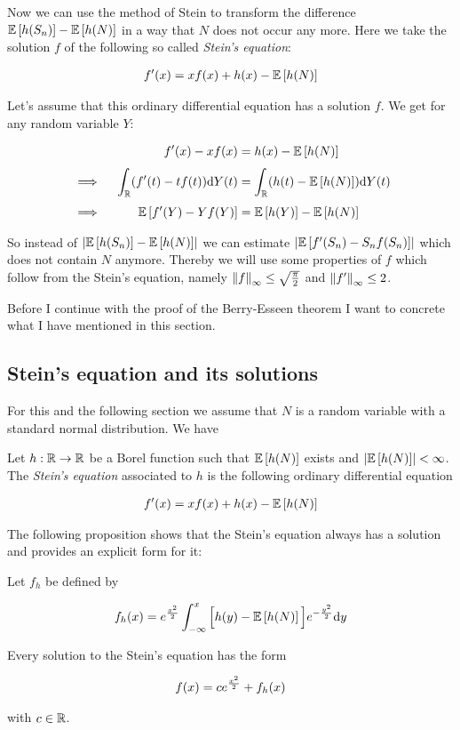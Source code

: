 Now we can use the method of Stein to transform the difference $\mathbb E\left[{h(S_n)}\right]-\mathbb E\left[{h(N)}\right]$ in a way that $N$ does not occur any more. Here we take the solution $f$ of the following so called \emph{Stein's equation}:

\begin{align}
  f'(x)=xf(x) + h(x) - \mathbb E\left[{h(N)}\right]
\end{align}

Let's assume that this ordinary differential equation has a solution $f$. We get for any random variable $Y$:

\begin{align}
  &               & f'(x) - xf(x) & = h(x) - \E{h(N)} \nl
  &  \implies\ & \int_{\R} (f'(t)-t f(t)) \d{Y}(t) &= \int_{\R} (h(t)-\E{h(N)}) \d{Y}(t) \nl 
  &  \implies\ & \E{f'(Y)-Y f(Y)} &= \E{h(Y)}-\E{h(N)}
\end{align}

So instead of $\left|{\mathbb E\left[{h(S_n)}\right]-\mathbb E\left[{h(N)}\right]}\right|$ we can estimate $\left|{\mathbb E\left[{f'(S_n)-S_n f(S_n)}\right]}\right|$ which does not contain $N$ anymore. Thereby we will use some properties of $f$ which follow from the Stein's equation, namely $\left\|{f}\right\|_\infty \le \sqrt{\tfrac \pi2}$ and $\left\|{f'}\right\|_\infty \le 2$.

Before I continue with the proof of the Berry-Esseen theorem I want to concrete what I have mentioned in this section.

\subsection{Stein's equation and its solutions}

For this and the following section we assume that $N$ is a random variable with a standard normal distribution. We have

\begin{definition}
  Let $h:\mathbb R \to \mathbb R$ be a Borel function such that $\mathbb E\left[{h(N)}\right]$ exists and $\left|{\mathbb E\left[{h(N)}\right]}\right| < \infty$. The \emph{Stein's equation} associated to $h$ is the following ordinary differential equation

  \begin{align}
    f'(x) = x f(x) + h(x) - \mathbb E\left[{h(N)}\right]
  \end{align}
\end{definition}

The following proposition shows that the Stein's equation always has a solution and provides an explicit form for it:

\begin{proposition}
  Let $f_h$ be defined by

  \begin{align}
    f_h(x) = e^{\frac{x^2}{2}} \int_{-\infty}^x \Big[h(y)-\mathbb E\left[{h(N)}\right]\Big] e^{-\frac{y^2}{2}}\mathrm d{y}
  \end{align}

  \noindent Every solution to the Stein's equation has the form

  \begin{align}
    f(x) = c e^{\frac{x^2}{2}} + f_h(x)
  \end{align}

  \noindent with $c \in \mathbb R$.
\end{proposition}


